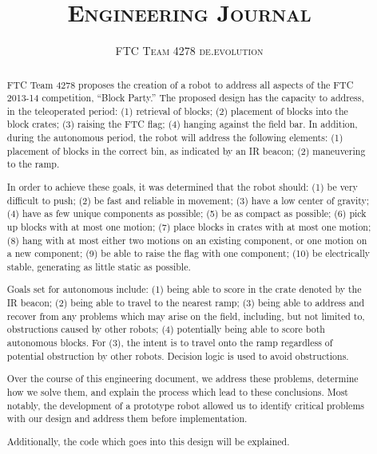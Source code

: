 \documentclass{article}
\title{\textsc{\textbf{Engineering Journal}}}
\author{\textsc{FTC Team 4278 de.evolution}}
\begin{document}
\maketitle

\begin{abstract}
FTC Team 4278 proposes the creation of a robot to address all aspects of the FTC 2013-14 competition, ``Block Party.'' The proposed design has the capacity to address, in the teleoperated period: (1) retrieval of blocks; (2) placement of blocks into the block crates; (3) raising the FTC flag; (4) hanging against the field bar. In addition, during the autonomous period, the robot will address the following elements: (1) placement of blocks in the correct bin, as indicated by an IR beacon; (2) maneuvering to the ramp. 

In order to achieve these goals, it was determined that the robot should: (1) be very difficult to push; (2) be fast and reliable in movement; (3) have a low center of gravity; (4) have as few unique components as possible; (5) be as compact as possible; (6) pick up blocks with at most one motion; (7) place blocks in crates with at most one motion; (8) hang with at most either two motions on an existing component, or one motion on a new component; (9) be able to raise the flag with one component; (10) be electrically stable, generating as little static as possible. 

Goals set for autonomous include: (1) being able to score in the crate denoted by the IR beacon; (2) being able to travel to the nearest ramp; (3) being able to address and recover from any problems which may arise on the field, including, but not limited to, obstructions caused by other robots; (4) potentially being able to score both autonomous blocks. For (3), the intent is to travel onto the ramp regardless of potential obstruction by other robots. Decision logic is used to avoid obstructions.

Over the course of this engineering document, we address these problems, determine how we solve them, and explain the process which lead to these conclusions. Most notably, the development of a prototype robot allowed us to identify critical problems with our design and address them before implementation.

Additionally, the code which goes into this design will be explained.
\end{abstract}\newpage\tableofcontents\newpage
\end{document}
